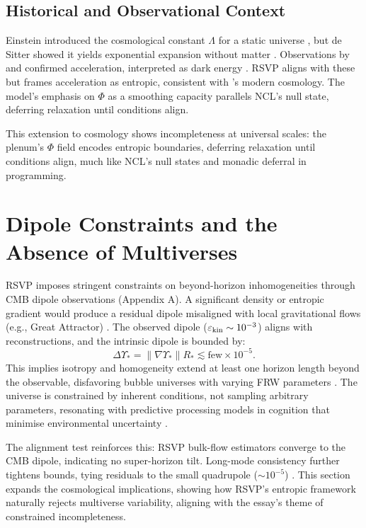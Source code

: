 \documentclass{article}
\begin{document}
{{\subsection{Historical and Observational Context}
Einstein introduced the cosmological constant \(\Lambda\) for a static universe \citep{einstein1917}, but de Sitter showed it yields exponential expansion without matter \citep{desitter1917}. Observations by \citet{riess1998} and \citet{perlmutter1999} confirmed acceleration, interpreted as dark energy \citep{peebles2003}. RSVP aligns with these but frames acceleration as entropic, consistent with \citet{dodelson2003}'s modern cosmology. The model's emphasis on \(\Phi\) as a smoothing capacity parallels NCL's null state, deferring relaxation until conditions align.

This extension to cosmology shows incompleteness at universal scales: the plenum's \(\Phi\) field encodes entropic boundaries, deferring relaxation until conditions align, much like NCL's null states and monadic deferral in programming.

\section{Dipole Constraints and the Absence of Multiverses}
\label{sec:dipole}
RSVP imposes stringent constraints on beyond-horizon inhomogeneities through CMB dipole observations (Appendix A). A significant density or entropic gradient would produce a residual dipole misaligned with local gravitational flows (e.g., Great Attractor) \citep{riess1998, perlmutter1999}. The observed dipole (\(\varepsilon_{\rm kin} \sim 10^{-3}\)) aligns with reconstructions, and the intrinsic dipole is bounded by:
\begin{equation}
\Delta \Upsilon_* = \|\nabla \Upsilon_*\| R_* \lesssim \text{few} \times 10^{-5}.
\end{equation}
This implies isotropy and homogeneity extend at least one horizon length beyond the observable, disfavoring bubble universes with varying FRW parameters \citep{dodelson2003}. The universe is constrained by inherent conditions, not sampling arbitrary parameters, resonating with predictive processing models in cognition that minimise environmental uncertainty \citep{clark2013, hohwy2013}.

The alignment test reinforces this: RSVP bulk-flow estimators converge to the CMB dipole, indicating no super-horizon tilt. Long-mode consistency further tightens bounds, tying residuals to the small quadrupole (\(\sim 10^{-5}\)) \citep{whittle2006}. This section expands the cosmological implications, showing how RSVP's entropic framework naturally rejects multiverse variability, aligning with the essay's theme of constrained incompleteness.

}}
\end{document}

